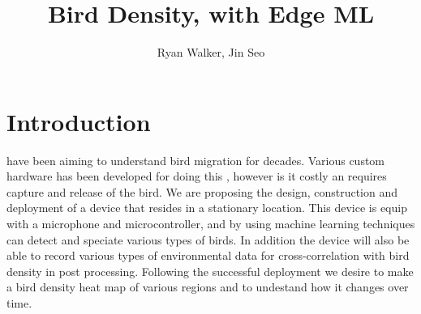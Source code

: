 \documentclass[12pt,journal,compsoc]{IEEEtran}
\begin{document}
\title{Bird Density, with Edge ML}
\author{Ryan Walker, Jin Seo}

\IEEEtitleabstractindextext{%
}

\maketitle
\IEEEpeerreviewmaketitle


\section{Introduction}
 have been aiming to understand bird migration for decades. Various custom hardware has been developed for doing this \cite{BirdTracking}, however is it costly an requires capture and release of the bird. We are proposing the design, construction and deployment of a device that resides in a stationary location. This device is equip with a microphone and microcontroller, and by using machine learning techniques \cite{ML1} \cite{ML2} can detect and speciate various types of birds. In addition the device will also be able to record various types of environmental data for cross-correlation with bird density in post processing. Following the successful deployment we desire to make a bird density heat map of various regions and to undestand how it changes over time.
\end{document}
